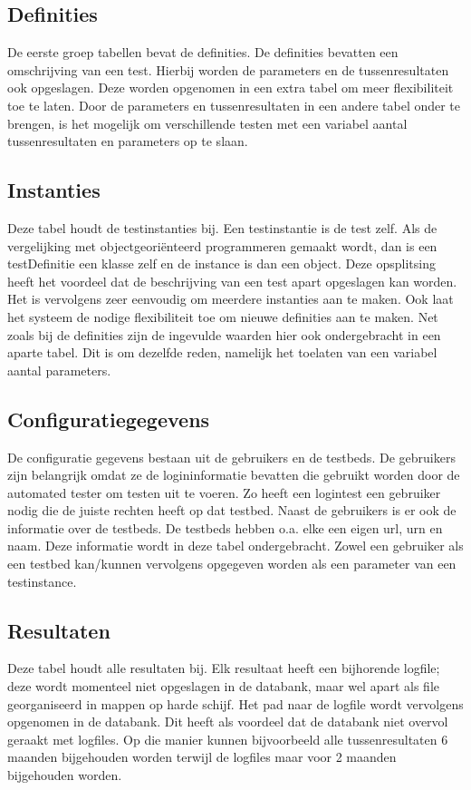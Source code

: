 \subsection{Definities}
\npar
De eerste groep tabellen bevat de definities. De definities bevatten een omschrijving van een test. Hierbij worden de parameters en de tussenresultaten ook opgeslagen. Deze worden opgenomen in een extra tabel om meer flexibiliteit toe te laten. Door de parameters en tussenresultaten in een andere tabel onder te brengen, is het mogelijk om verschillende testen met een variabel aantal tussenresultaten en parameters op te slaan.
\subsection{Instanties}
\npar
Deze tabel houdt de testinstanties bij. Een testinstantie is de test zelf. Als de vergelijking met objectgeori\"enteerd programmeren gemaakt wordt, dan is een testDefinitie een klasse zelf en de instance is dan een object. Deze opsplitsing heeft het voordeel dat de beschrijving van een test apart opgeslagen kan worden. Het is vervolgens zeer eenvoudig om meerdere instanties aan te maken. Ook laat het systeem de nodige flexibiliteit toe om nieuwe definities aan te maken. Net zoals bij de definities zijn de ingevulde waarden hier ook ondergebracht in een aparte tabel. Dit is om dezelfde reden, namelijk het toelaten van een variabel aantal parameters.
\subsection{Configuratiegegevens}
\npar
De configuratie gegevens bestaan uit de gebruikers en de testbeds. De gebruikers zijn belangrijk omdat ze de logininformatie bevatten die gebruikt worden door de automated tester om testen uit te voeren. Zo heeft een logintest een gebruiker nodig die de juiste rechten heeft op dat testbed.
Naast de gebruikers is er ook de informatie over de testbeds. De testbeds hebben o.a. elke een eigen url, urn en naam. Deze informatie wordt in deze tabel ondergebracht. Zowel een gebruiker als een testbed kan/kunnen vervolgens opgegeven worden als een parameter van een testinstance. 
\subsection{Resultaten}
\npar
Deze tabel houdt alle resultaten bij. Elk resultaat heeft een bijhorende logfile; deze wordt momenteel niet opgeslagen in de databank, maar wel apart als file georganiseerd in mappen op harde schijf. Het pad naar de logfile wordt vervolgens opgenomen in de databank. Dit heeft als voordeel dat de databank niet overvol geraakt met logfiles. Op die manier kunnen bijvoorbeeld alle tussenresultaten 6 maanden bijgehouden worden terwijl de logfiles maar voor 2 maanden bijgehouden worden.
\clearpage

